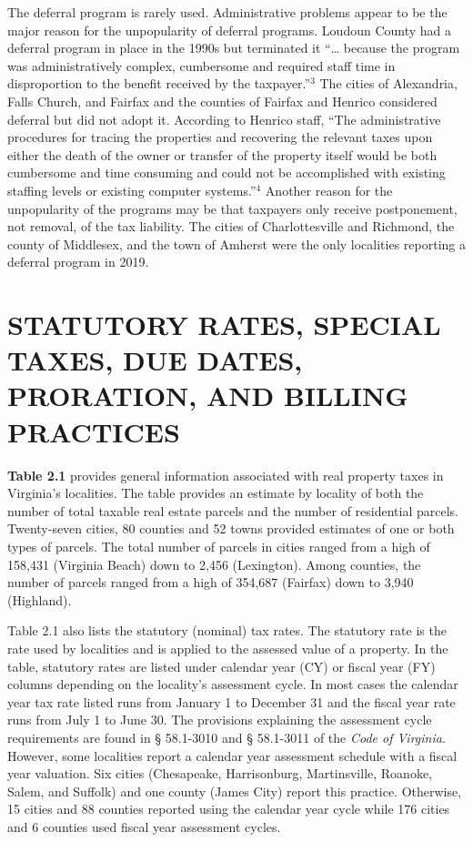 \documentclass[
]{book}
\begin{document}
The deferral program is rarely used. Administrative problems appear to be the major reason for the unpopularity of deferral programs. Loudoun County had a deferral program in place in the 1990s but terminated it ``\ldots{} because the program was administratively complex, cumbersome and required staff time in disproportion to the benefit received by the taxpayer.''\(^3\) The cities of Alexandria, Falls Church, and Fairfax and the counties of Fairfax and Henrico considered deferral but
did not adopt it. According to Henrico staff, ``The administrative procedures for tracing the properties and recovering the
relevant taxes upon either the death of the owner or transfer of the property itself would be both cumbersome and time consuming and could not be accomplished with existing staffing levels or existing computer systems.''\(^4\) Another reason for the unpopularity of the programs may be that taxpayers only receive postponement, not removal, of the tax liability. The cities of Charlottesville and Richmond, the county of Middlesex, and the town of Amherst were the only localities reporting a deferral program in 2019.

\hypertarget{statutory-rates-special-taxes-due-dates-proration-and-billing-practices}{%
\section{STATUTORY RATES, SPECIAL TAXES, DUE DATES, PRORATION, AND BILLING PRACTICES}\label{statutory-rates-special-taxes-due-dates-proration-and-billing-practices}}

\textbf{Table 2.1} provides general information associated with real property taxes in Virginia's localities. The table provides
an estimate by locality of both the number of total taxable real estate parcels and the number of residential parcels.
Twenty-seven cities, 80 counties and 52 towns provided estimates of one or both types of parcels. The total number of parcels in cities ranged from a high of 158,431 (Virginia Beach) down to 2,456 (Lexington). Among counties, the number of parcels ranged from a high of 354,687 (Fairfax) down to 3,940 (Highland).

Table 2.1 also lists the statutory (nominal) tax rates. The statutory rate is the rate used by localities and is applied to the assessed value of a property. In the table, statutory rates are listed under calendar year (CY) or fiscal year (FY) columns depending on the locality's assessment cycle. In most cases the calendar year tax rate listed runs from January 1 to December 31 and the fiscal year rate runs from July 1 to June 30. The provisions explaining the assessment cycle requirements are found in § 58.1-3010 and § 58.1-3011 of the \emph{Code of Virginia}. However, some localities report a calendar year assessment schedule with a fiscal year valuation. Six cities (Chesapeake, Harrisonburg, Martinsville, Roanoke, Salem, and Suffolk) and one county (James City) report this practice. Otherwise, 15 cities and 88 counties reported using the calendar year cycle while 176 cities and 6 counties used fiscal year assessment cycles.
\end{document}
